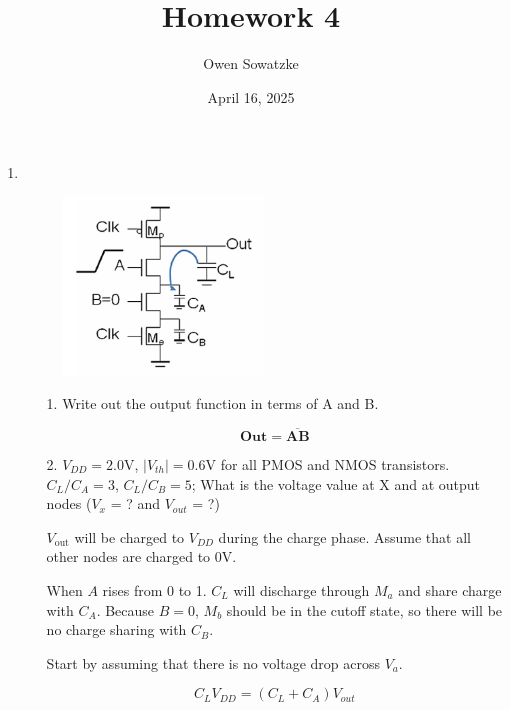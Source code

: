 \documentclass[fleqn]{article}
\title{Homework 4}
\author{Owen Sowatzke}
\date{April 16, 2025}
\newcommand{\zerodisplayskip}{
	\setlength{\abovedisplayskip}{0pt}%
	\setlength{\belowdisplayskip}{0pt}%
	\setlength{\abovedisplayshortskip}{0pt}%
	\setlength{\belowdisplayshortskip}{0pt}%
	\setlength{\mathindent}{0pt}}
\begin{document}
	\offinterlineskip
	\setlength{\lineskip}{12pt}
	\zerodisplayskip
	\maketitle
	
	\begin{enumerate}
		\item ~
		
			\begin{figure}[H]
				\centerline{\includegraphics[width=0.5\textwidth]{circuit_question1.png}}
				\label{fig::circuit_question1}
			\end{figure}

			\begin{enumerate}
			\item[1.] Write out the output function in terms of A and B.			
			
			\begin{equation*}
				\mathbf{Out = \overline{AB}}
			\end{equation*}
			
			\item[2.] $V_{DD}=2.0\text{V}$, $|V_{th}|=0.6\text{V}$ for all PMOS and NMOS transistors. $C_L/C_A=3$, $C_L/C_B=5$; What is the voltage value at X and at output nodes ($V_x$ = ? and $V_{out}$ = ?)
			
			$V_{\text{out}}$ will be charged to $V_{DD}$ during the charge phase. Assume that all other nodes are charged to $0\text{V}$.
			
			When $A$ rises from 0 to 1. $C_L$ will discharge through $M_a$ and share charge with $C_A$. Because $B=0$, $M_b$ should be in the cutoff state, so there will be no charge sharing with $C_B$.
			
			Start by assuming that there is no voltage drop across $V_a$.
			
			\begin{equation*}
				C_LV_{DD} = (C_L + C_A)V_{out} 
			\end{equation*}			
			

\end{enumerate}
\end{enumerate}
\end{document}
